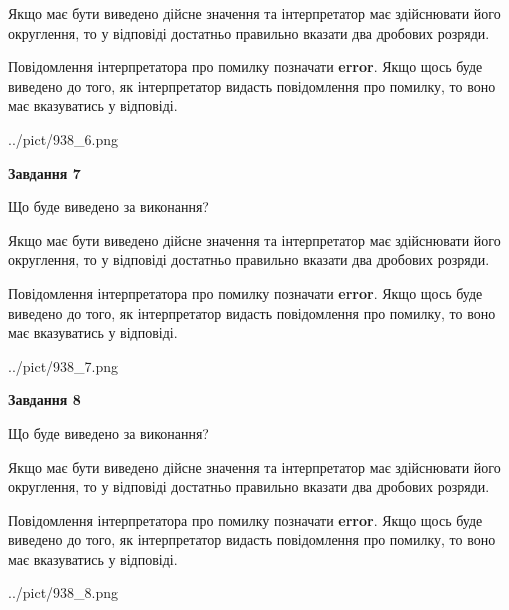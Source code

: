 \documentclass[12pt, ukrainian]{article}
\begin{document}
{\begin {Large}
Якщо має бути виведено дійсне значення та інтерпретатор має здійснювати його округлення, 
то у відповіді достатньо правильно вказати два дробових розряди.

Повідомлення інтерпретатора про помилку позначати \textbf{error}.
Якщо щось буде виведено до того, як інтерпретатор видасть повідомлення про помилку, 
то воно має вказуватись у відповіді. \par

\begin{center}
	{../pict/938_6.png}
\end{center}
\newpage

{\begin {center}\textbf{Завдання 7}\end {center}}\par
Що буде виведено за виконання? \par

Якщо має бути виведено дійсне значення та інтерпретатор має здійснювати його округлення, 
то у відповіді достатньо правильно вказати два дробових розряди.

Повідомлення інтерпретатора про помилку позначати \textbf{error}.
Якщо щось буде виведено до того, як інтерпретатор видасть повідомлення про помилку, 
то воно має вказуватись у відповіді. \par

\begin{center}
	{../pict/938_7.png}
\end{center}
\newpage

{\begin {center}\textbf{Завдання 8}\end {center}}\par
Що буде виведено за виконання? \par

Якщо має бути виведено дійсне значення та інтерпретатор має здійснювати його округлення, 
то у відповіді достатньо правильно вказати два дробових розряди.

Повідомлення інтерпретатора про помилку позначати \textbf{error}.
Якщо щось буде виведено до того, як інтерпретатор видасть повідомлення про помилку, 
то воно має вказуватись у відповіді. \par

\begin{center}
	{../pict/938_8.png}
\end{center}
\newpage


\end{Large}}
\end{document}
